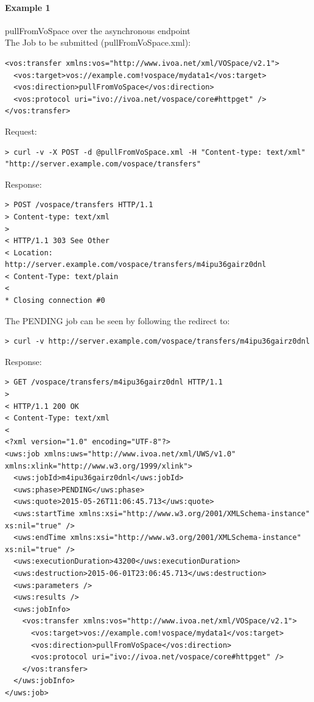 \documentclass[11pt,a4paper]{ivoa}
\begin{document}
\paragraph{Example 1}
pullFromVoSpace over the asynchronous endpoint
\\[5px]
\noindent
The Job to be submitted (pullFromVoSpace.xml):
\begin{lstlisting}
<vos:transfer xmlns:vos="http://www.ivoa.net/xml/VOSpace/v2.1">
  <vos:target>vos://example.com!vospace/mydata1</vos:target>
  <vos:direction>pullFromVoSpace</vos:direction>
  <vos:protocol uri="ivo://ivoa.net/vospace/core#httpget" />
</vos:transfer>
\end{lstlisting}
Request:
\begin{lstlisting}
> curl -v -X POST -d @pullFromVoSpace.xml -H "Content-type: text/xml" "http://server.example.com/vospace/transfers"
\end{lstlisting}
Response:
\begin{lstlisting}
> POST /vospace/transfers HTTP/1.1
> Content-type: text/xml
>
< HTTP/1.1 303 See Other
< Location: http://server.example.com/vospace/transfers/m4ipu36gairz0dnl
< Content-Type: text/plain
<
* Closing connection #0
\end{lstlisting}
The PENDING job can be seen by following the redirect to:
\begin{lstlisting}
> curl -v http://server.example.com/vospace/transfers/m4ipu36gairz0dnl
\end{lstlisting}
Response:
\begin{lstlisting}
> GET /vospace/transfers/m4ipu36gairz0dnl HTTP/1.1
>
< HTTP/1.1 200 OK
< Content-Type: text/xml
<
<?xml version="1.0" encoding="UTF-8"?>
<uws:job xmlns:uws="http://www.ivoa.net/xml/UWS/v1.0" xmlns:xlink="http://www.w3.org/1999/xlink">
  <uws:jobId>m4ipu36gairz0dnl</uws:jobId>
  <uws:phase>PENDING</uws:phase>
  <uws:quote>2015-05-26T11:06:45.713</uws:quote>
  <uws:startTime xmlns:xsi="http://www.w3.org/2001/XMLSchema-instance" xs:nil="true" />
  <uws:endTime xmlns:xsi="http://www.w3.org/2001/XMLSchema-instance" xs:nil="true" />
  <uws:executionDuration>43200</uws:executionDuration>
  <uws:destruction>2015-06-01T23:06:45.713</uws:destruction>
  <uws:parameters />
  <uws:results />
  <uws:jobInfo>
    <vos:transfer xmlns:vos="http://www.ivoa.net/xml/VOSpace/v2.1">
      <vos:target>vos://example.com!vospace/mydata1</vos:target>
      <vos:direction>pullFromVoSpace</vos:direction>
      <vos:protocol uri="ivo://ivoa.net/vospace/core#httpget" />
    </vos:transfer>
  </uws:jobInfo>
</uws:job>
\end{lstlisting}
\end{document}
